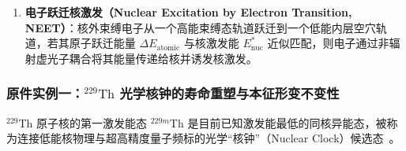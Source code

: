\begin{enumerate}
\textbf{物理机制严格辨析}：NEEC（末态电子被捕获为原子束缚态，严格单能共振）与 NEIES（初末态电子皆为连续谱波函数，非捕获非弹性散射）在相互作用矩阵元、末态相空间归一化以及能量匹配机制上存在本质区别。对于 NEIES，只要入射电子动能高于激发阈值（$E_e > E_{\mathrm{nuc}}^*$），其非弹性散射通道在运动学上即行开放，通常表现为平滑的连续阈值激发函数。需要说明的是，在特定的复杂低能电子--离子碰撞模型中，非弹性散射连续谱可能叠加坡形共振（Shape Resonances）或 Feshbach 自电离共振结构，但其出射电子处于连续谱的基本物理图像与作为束缚态捕获的 NEEC 绝非同义，不可混为一谈。
\item \textbf{电子跃迁核激发（Nuclear Excitation by Electron Transition, NEET）}：核外束缚电子从一个高能束缚态轨道跃迁到一个低能内层空穴轨道，若其原子跃迁能量 $\Delta E_{\mathrm{atomic}}$ 与核激发能 $E_{\mathrm{nuc}}^*$ 近似匹配，则电子通过非辐射虚光子耦合将其能量传递给核并诱发核激发。
\end{enumerate}

\subsubsection{原件实例一：$^{229}\mathrm{Th}$ 光学核钟的寿命重塑与本征形变不变性}

$^{229}\mathrm{Th}$ 原子核的第一激发能态 $^{229m}\mathrm{Th}$ 是目前已知激发能最低的同核异能态，被称为连接低能核物理与超高精度量子频标的光学“核钟”（Nuclear Clock）候选态~\cite{beeks-2021-thorium-229-isomer-nuclear-clock,kraemer-2023-radiative-decay-229th-isomer}。

